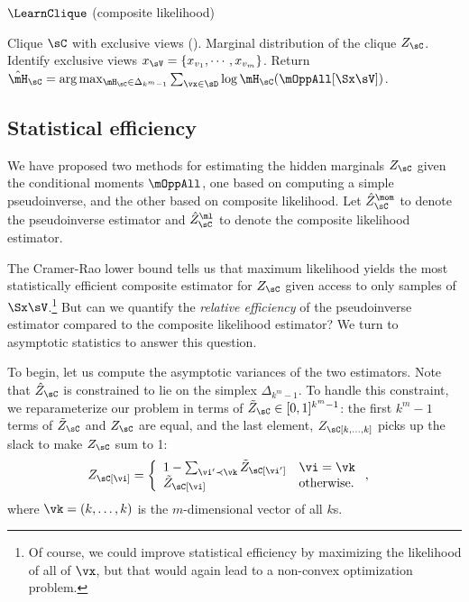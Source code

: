 \begin{algorithm}
  \caption{$\LearnClique$ (composite likelihood)}
  \label{algo:piecewise}
  \begin{algorithmic}
    \REQUIRE Clique $\sC$ with exclusive views ().
    \ENSURE Marginal distribution of the clique $Z_\sC$.
\STATE Identify exclusive views $x_\sV = \{x_{v_1}, \cdots, x_{v_m}\}$.
\STATE Return $\hat \mH_\sC = \arg\max_{\mH_\sC \in \Delta_{k^m-1}} \sum_{\vx \in \sD} \log \mH_\sC(\mOppAll[\Sx \sV])$.
  \end{algorithmic}
\end{algorithm}

\subsection{Statistical efficiency}

We have proposed two methods for estimating the hidden marginals $Z_\sC$ given
the conditional moments $\mOppAll$, one based on computing a simple pseudoinverse,
and the other based on composite likelihood.
Let $\hat Z^\mom_\sC$ to denote the pseudoinverse estimator and $\hat
  Z^\ml_\sC$ to denote the composite likelihood estimator.

The Cramer-Rao lower bound tells us that maximum likelihood yields the
  most statistically efficient composite estimator for $Z_\sC$ given
  access to only samples of $\Sx\sV$.\footnote{Of course, we could improve
  statistical efficiency by maximizing the likelihood of all of $\vx$, but
  that would again lead to a non-convex optimization problem.}
But can we quantify the \emph{relative efficiency} of the pseudoinverse
  estimator compared to the composite likelihood estimator?
We turn to asymptotic statistics to answer this question. 

To begin, let us compute the asymptotic variances of the two estimators. 
Note that $\hat Z_\sC$ is constrained to lie on the simplex
  $\Delta_{k^m-1}$. 
To handle this constraint, we reparameterize our problem in
  terms of $\tilde Z_\sC \in [0,1]^{k^m-1}$: the first $k^m -1$ terms of
  $\tilde Z_\sC$ and $Z_\sC$ are equal, and the last element, $Z_\sC[k,
  \ldots, k]$ picks up the slack to make $Z_\sC$ sum to 1:
\begin{align*}
  Z_\sC[\vi] &= \left\{
    \begin{array}{ll}
      1 - \sum_{\vi' \prec \vk} \tilde Z_\sC[\vi'] & \vi = \vk \\
      \tilde Z_\sC[\vi] & \text{otherwise.}
      \end{array}
      \right.,
\end{align*} 
where $\vk = (k, \ldots, k)$ is the $m$-dimensional vector of all $k$s. 


